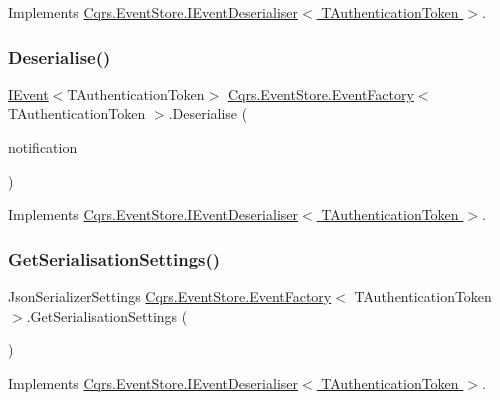 Implements \hyperlink{interfaceCqrs_1_1EventStore_1_1IEventDeserialiser_ad84a4d975f6e2b5b1fef3fd23e738bfd}{Cqrs.\+Event\+Store.\+I\+Event\+Deserialiser$<$ T\+Authentication\+Token $>$}.

\mbox{\label{classCqrs_1_1EventStore_1_1EventFactory_a1be7f3c4014991bc4b9619eaa2e8b9a4}} 
\subsubsection{\texorpdfstring{Deserialise()}{Deserialise()}\hspace{0.1cm}{\footnotesize\ttfamily [2/2]}}
{\footnotesize\ttfamily \hyperlink{interfaceCqrs_1_1Events_1_1IEvent}{I\+Event}$<$T\+Authentication\+Token$>$ \hyperlink{classCqrs_1_1EventStore_1_1EventFactory}{Cqrs.\+Event\+Store.\+Event\+Factory}$<$ T\+Authentication\+Token $>$.Deserialise (\begin{DoxyParamCaption}\item[{Resolved\+Event}]{notification }\end{DoxyParamCaption})}



Implements \hyperlink{interfaceCqrs_1_1EventStore_1_1IEventDeserialiser_a931d4a498b2213aac492bd35518a3286}{Cqrs.\+Event\+Store.\+I\+Event\+Deserialiser$<$ T\+Authentication\+Token $>$}.

\mbox{\label{classCqrs_1_1EventStore_1_1EventFactory_a4e52c4fd639d1af97b1ecc5052189783}} 
\subsubsection{\texorpdfstring{Get\+Serialisation\+Settings()}{GetSerialisationSettings()}}
{\footnotesize\ttfamily Json\+Serializer\+Settings \hyperlink{classCqrs_1_1EventStore_1_1EventFactory}{Cqrs.\+Event\+Store.\+Event\+Factory}$<$ T\+Authentication\+Token $>$.Get\+Serialisation\+Settings (\begin{DoxyParamCaption}{ }\end{DoxyParamCaption})}



Implements \hyperlink{interfaceCqrs_1_1EventStore_1_1IEventDeserialiser_aa2859d10fd556b743679079ac15ffdde}{Cqrs.\+Event\+Store.\+I\+Event\+Deserialiser$<$ T\+Authentication\+Token $>$}.

